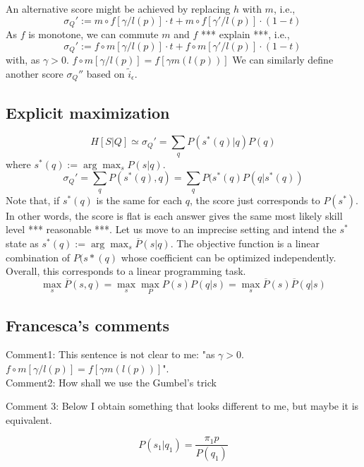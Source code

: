\documentclass[runningheads]{llncs}
\begin{document}
	{}
	
	
	
	An alternative score might be achieved by replacing $h$ with $m$, i.e.,
	\begin{equation}
		\sigma_Q' := 
		m \circ f[\gamma/l(p)] \cdot t +
		m \circ f[\gamma'/l(p)] \cdot (1-t)\,
	\end{equation}
	As $f$ is monotone, we can commute $m$ and $f$ *** explain ***, i.e.,
	\begin{equation}
		\sigma_Q' := 
		f \circ m[\gamma/l(p)] \cdot t +
		f \circ m[\gamma'/l(p)] \cdot (1-t)\,
	\end{equation}
	with, as $\gamma>0$. $f \circ m[\gamma/l(p)] = f[\gamma m(l(p))]$
	We can similarly define another score $\sigma_Q''$ based on $\tilde{i}_\epsilon$.
	\subsection*{Explicit maximization}
	$$H[S|Q]\simeq \sigma_Q' = \sum_q P(s^*(q)|q) P(q)$$
	where $s^*(q):=\arg\max_s P(s|q)$. 
	$$\sigma_Q'= \sum_q P(s^*(q),q) = \sum_q P(s^*(q) P(q|s^*(q))$$
	Note that, if $s^*(q)$ is the same for each $q$, the score just corresponds to $P(s^*)$. 
	In other words, the score is flat is each answer gives the same most likely skill level *** 
	reasonable ***. Let us move to an imprecise setting and intend the $s^*$ state as
	$s^*(q):=\arg\max_s \overline{P}(s|q)$. The objective function is a linear combination of 
	$P(s*(q)$ whose coefficient can be optimized independently. Overall, this corresponds 
	to a linear programming task.
	$$\max_s \overline{P}(s,q) = \max_s \max_P P(s) P(q|s) = \max_s \overline{P}(s) 
	\overline{P}(q|s)$$
	
	\subsection*{Francesca's comments}
	
	Comment1: This sentence is not clear to me:  "as $\gamma>0$. $f \circ m[\gamma/l(p)] 
	= f[\gamma m(l(p))]$".\\
	Comment2: How shall we use the Gumbel's trick
	
	
	Comment 3: Below I obtain something that looks different to me, but maybe it is 
	equivalent.  
	
	\begin{equation}
		P(s_1|q_1)=\frac{\pi_1 p}{P(q_1)}
	\end{equation}
	
\end{document}
